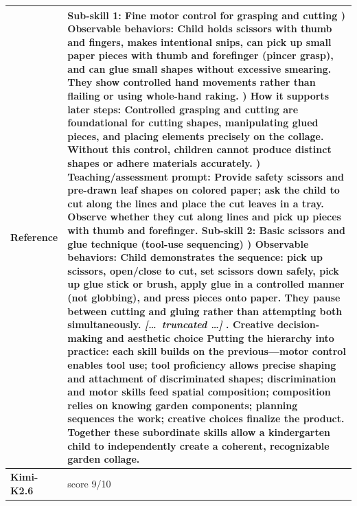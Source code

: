 \begin{longtable}{@{}l p{12.5cm}@{}}
  \textbf{Reference} & Sub-skill 1: Fine motor control for grasping and cutting \newline 1) Observable behaviors: Child holds scissors with thumb and fingers, makes intentional snips, can pick up small paper pieces with thumb and forefinger (pincer grasp), and can glue small shapes without excessive smearing. They show controlled hand movements rather than flailing or using whole-hand raking. \newline 2) How it supports later steps: Controlled grasping and cutting are foundational for cutting shapes, manipulating glued pieces, and placing elements precisely on the collage. Without this control, children cannot produce distinct shapes or adhere materials accurately. \newline 3) Teaching/assessment prompt: Provide safety scissors and pre-drawn leaf shapes on colored paper; ask the child to cut along the lines and place the cut leaves in a tray. Observe whether they cut along lines and pick up pieces with thumb and forefinger. \newline Sub-skill 2: Basic scissors and glue technique (tool-use sequencing) \newline 1) Observable behaviors: Child demonstrates the sequence: pick up scissors, open/close to cut, set scissors down safely, pick up glue stick or brush, apply glue in a controlled manner (not globbing), and press pieces onto paper. They pause between cutting and gluing rather than attempting both simultaneously. \newline \textit{[\ldots\ truncated \ldots]} \newline 7. Creative decision-making and aesthetic choice \newline Putting the hierarchy into practice: each skill builds on the previous---motor control enables tool use; tool proficiency allows precise shaping and attachment of discriminated shapes; discrimination and motor skills feed spatial composition; composition relies on knowing garden components; planning sequences the work; creative choices finalize the product. Together these subordinate skills allow a kindergarten child to independently create a coherent, recognizable garden collage. \\
  \midrule
  \textbf{Kimi-K2.6} & score 9/10 \\

\end{longtable}
